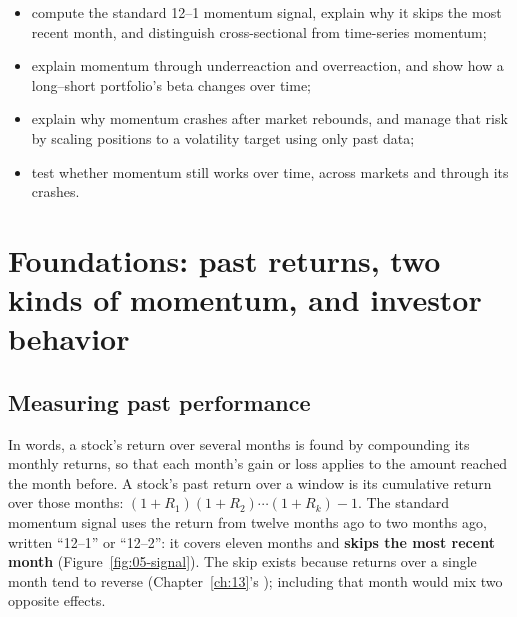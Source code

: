 \begin{itemize}
  \item compute the standard 12--1 momentum signal, explain why it skips the most recent month, and distinguish cross-sectional from time-series momentum;
  \item explain momentum through underreaction and overreaction, and show how a long--short portfolio's beta changes over time;
  \item explain why momentum crashes after market rebounds, and manage that risk by scaling positions to a volatility target using only past data;
  \item test whether momentum still works over time, across markets and through its crashes.
\end{itemize}



\section{Foundations: past returns, two kinds of momentum, and investor behavior}
\label{sec:05-foundations}

\subsection{Measuring past performance}

In words, a stock's return over several months is found by compounding its monthly returns, so that each month's gain or loss applies to the amount reached the month before. A stock's past return over a window is its cumulative return over those months: $(1 + R_1)(1 + R_2)\cdots(1 + R_k) - 1$. The standard momentum signal uses the return from twelve months ago to two months ago, written ``12--1'' or ``12--2'': it covers eleven months and \textbf{skips the most recent month} (Figure~\ref{fig:05-signal}). The skip exists because returns over a single month tend to reverse (Chapter~\ref{ch:13}'s ); including that month would mix two opposite effects.

